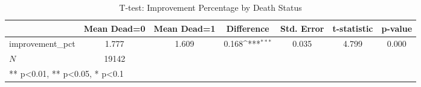 \begin{table}[htbp]\centering
\def\sym#1{\ifmmode^{#1}\else\(^{#1}\)\fi}
\caption{T-test: Improvement Percentage by Death Status}
\begin{tabular}{l*{1}{cccccc}}
\hline\hline
            & Mean Dead=0& Mean Dead=1&  Difference         &  Std. Error& t-statistic&     p-value\\
\hline
improvement\_pct&       1.777&       1.609&       0.168\sym{***}&       0.035&       4.799&       0.000\\
\hline
\(N\)       &       19142&            &                     &            &            &            \\
\hline\hline
\multicolumn{7}{l}{\footnotesize *** p<0.01, ** p<0.05, * p<0.1}\\
\end{tabular}
\end{table}
